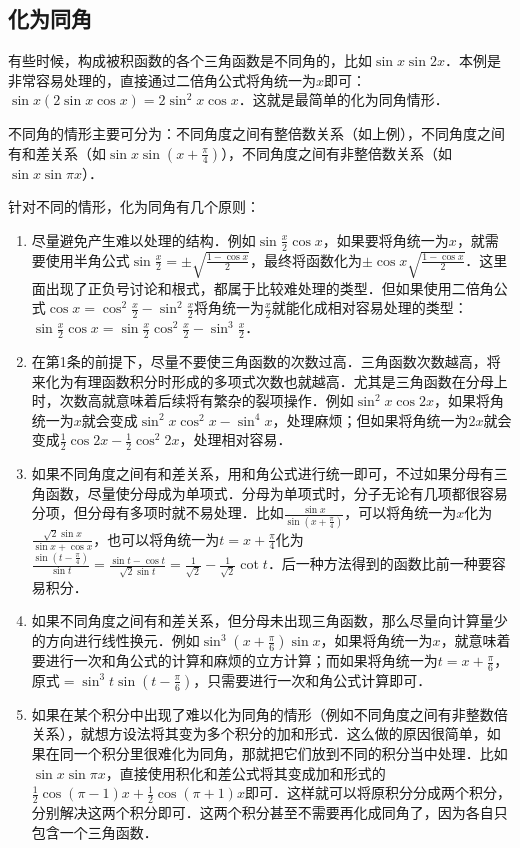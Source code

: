 \documentclass{ctexbook}
\begin{document}
\subsection{化为同角}
有些时候，构成被积函数的各个三角函数是不同角的，比如$\sin{x}\sin{2x}$．本例是非常容易处理的，直接通过二倍角公式将角统一为$x$即可：$\sin{x}\left(2\sin{x}\cos{x}\right)=2\sin^{2}{x}\cos{x}$．这就是最简单的化为同角情形．\par
不同角的情形主要可分为：不同角度之间有整倍数关系（如上例），不同角度之间有和差关系（如$\sin{x}\sin{\left(x+\frac{\pi}{4}\right)}$），不同角度之间有非整倍数关系（如$\sin{x}\sin{\pi x}$）．\par
针对不同的情形，化为同角有几个原则：\par
\begin{enumerate}
	\item 尽量避免产生难以处理的结构．例如$\sin{\frac{x}{2}}\cos{x}$，如果要将角统一为$x$，就需要使用半角公式$\sin{\frac{x}{2}}=\pm\sqrt{\frac{1-\cos{x}}{2}}$，最终将函数化为$\pm\cos{x}\sqrt{\frac{1-\cos{x}}{2}}$．这里面出现了正负号讨论和根式，都属于比较难处理的类型．但如果使用二倍角公式$\cos{x}=\cos^{2}{\frac{x}{2}}-\sin^{2}{\frac{x}{2}}$将角统一为$\frac{x}{2}$就能化成相对容易处理的类型：$\sin{\frac{x}{2}}\cos{x}=\sin{\frac{x}{2}}\cos^{2}{\frac{x}{2}}-\sin^{3}{\frac{x}{2}}$．
	\item 在第1条的前提下，尽量不要使三角函数的次数过高．三角函数次数越高，将来化为有理函数积分时形成的多项式次数也就越高．尤其是三角函数在分母上时，次数高就意味着后续将有繁杂的裂项操作．例如$\sin^{2}{x}\cos{2x}$，如果将角统一为$x$就会变成$\sin^{2}{x}\cos^{2}{x}-\sin^{4}{x}$，处理麻烦；但如果将角统一为$2x$就会变成$\frac{1}{2}\cos{2x}-\frac{1}{2}\cos^{2}{2x}$，处理相对容易．
	\item 如果不同角度之间有和差关系，用和角公式进行统一即可，不过如果分母有三角函数，尽量使分母成为单项式．分母为单项式时，分子无论有几项都很容易分项，但分母有多项时就不易处理．比如$\frac{\sin{x}}{\sin{\left(x+\frac{\pi}{4}\right)}}$，可以将角统一为$x$化为$\frac{\sqrt{2}\sin{x}}{\sin{x}+\cos{x}}$，也可以将角统一为$t=x+\frac{\pi}{4}$化为$\frac{\sin{\left(t-\frac{\pi}{4}\right)}}{\sin{t}}=\frac{\sin{t}-\cos{t}}{\sqrt{2}\sin{t}}=\frac{1}{\sqrt{2}}-\frac{1}{\sqrt{2}}\cot{t}$．后一种方法得到的函数比前一种要容易积分．
	\item 如果不同角度之间有和差关系，但分母未出现三角函数，那么尽量向计算量少的方向进行线性换元．例如$\sin^{3}{\left(x+\frac{\pi}{6}\right)}\sin{x}$，如果将角统一为$x$，就意味着要进行一次和角公式的计算和麻烦的立方计算；而如果将角统一为$t=x+\frac{\pi}{6}$，原式$=\sin^{3}{t}\sin{\left(t-\frac{\pi}{6}\right)}$，只需要进行一次和角公式计算即可．
	\item 如果在某个积分中出现了难以化为同角的情形（例如不同角度之间有非整数倍关系），就想方设法将其变为多个积分的加和形式．这么做的原因很简单，如果在同一个积分里很难化为同角，那就把它们放到不同的积分当中处理．比如$\sin{x}\sin{\pi x}$，直接使用积化和差公式将其变成加和形式的$\frac{1}{2}\cos{\left(\pi-1\right)x}+\frac{1}{2}\cos{\left(\pi+1\right)x}$即可．这样就可以将原积分分成两个积分，分别解决这两个积分即可．这两个积分甚至不需要再化成同角了，因为各自只包含一个三角函数．
\end{enumerate}\par
\end{document}
